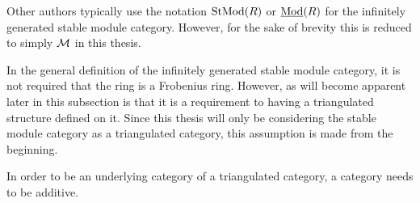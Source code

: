 Other authors typically use the notation \( \operatorname{StMod}(R) \) or \( \underline{\operatorname{Mod}}(R) \) for the infinitely generated stable module category. However, for the sake of brevity this is reduced to simply \( {\mathcal{M}} \) in this thesis.

In the general definition of the infinitely generated stable module category, it is not required that the ring is a Frobenius ring. However, as will become apparent later in this subsection is that it is a requirement to having a triangulated structure defined on it. Since this thesis will only be considering the stable module category as a triangulated category, this assumption is made from the beginning.

In order to be an underlying category of a triangulated category, a category needs to be additive.

